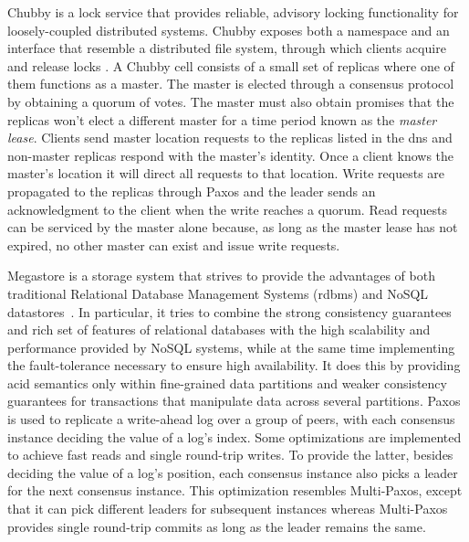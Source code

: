 Chubby is a lock service that provides reliable, advisory locking functionality for loosely-coupled distributed systems. Chubby exposes both a namespace and an interface that resemble a distributed file system, through which clients acquire and release locks \cite{Burrows2006}. A Chubby cell consists of a small set of replicas where one of them functions as a master. The master is elected through a consensus protocol by obtaining a quorum of votes. The master must also obtain promises that the replicas won't elect a different master for a time period known as the \textit{master lease}. Clients send master location requests to the replicas listed in the \acrfull{dns} and non-master replicas respond with the master's identity. Once a client knows the master's location it will direct all requests to that location. Write requests are propagated to the replicas through Paxos and the leader sends an acknowledgment to the client when the write reaches a quorum. Read requests can be serviced by the master alone because, as long as the master lease has not expired, no other master can exist and issue write requests.\par
Megastore is a storage system that strives to provide the advantages of both traditional Relational Database Management Systems (\acrshort{rdbms}) and NoSQL datastores~\cite{36971}. In particular, it tries to combine the strong consistency guarantees and rich set of features of relational databases with the high scalability and performance provided by NoSQL systems, while at the same time implementing the fault-tolerance necessary to ensure high availability. It does this by providing \acrfull{acid} semantics only within fine-grained data partitions and weaker consistency guarantees for transactions that manipulate data across several partitions. Paxos is used to replicate a write-ahead log over a group of peers, with each consensus instance deciding the value of a log's index. Some optimizations are implemented to achieve fast reads and single round-trip writes. To provide the latter, besides deciding the value of a log's position, each consensus instance also picks a leader for the next consensus instance. This optimization resembles Multi-Paxos, except that it can pick different leaders for subsequent instances whereas Multi-Paxos provides single round-trip commits as long as the leader remains the same. \par